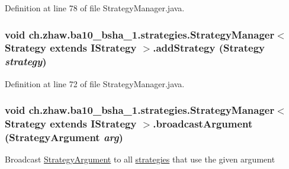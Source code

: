 Definition at line 78 of file StrategyManager.java.\hypertarget{classch_1_1zhaw_1_1ba10__bsha__1_1_1strategies_1_1StrategyManager_3_01Strategy_01extends_01IStrategy_01_4_aa3357bbf3d2374c3999ddf5195f31733}{
\subsubsection[{addStrategy}]{\setlength{\rightskip}{0pt plus 5cm}void ch.zhaw.ba10\_\-bsha\_\-1.strategies.StrategyManager$<$ Strategy extends {\bf IStrategy} $>$.addStrategy (Strategy {\em strategy})}}
\label{classch_1_1zhaw_1_1ba10__bsha__1_1_1strategies_1_1StrategyManager_3_01Strategy_01extends_01IStrategy_01_4_aa3357bbf3d2374c3999ddf5195f31733}


Definition at line 72 of file StrategyManager.java.\hypertarget{classch_1_1zhaw_1_1ba10__bsha__1_1_1strategies_1_1StrategyManager_3_01Strategy_01extends_01IStrategy_01_4_a1bf1d33af692c8658a24d0b935c4f039}{
\subsubsection[{broadcastArgument}]{\setlength{\rightskip}{0pt plus 5cm}void ch.zhaw.ba10\_\-bsha\_\-1.strategies.StrategyManager$<$ Strategy extends {\bf IStrategy} $>$.broadcastArgument ({\bf StrategyArgument} {\em arg})}}
\label{classch_1_1zhaw_1_1ba10__bsha__1_1_1strategies_1_1StrategyManager_3_01Strategy_01extends_01IStrategy_01_4_a1bf1d33af692c8658a24d0b935c4f039}
Broadcast \hyperlink{classch_1_1zhaw_1_1ba10__bsha__1_1_1StrategyArgument}{StrategyArgument} to all \hyperlink{namespacech_1_1zhaw_1_1ba10__bsha__1_1_1strategies}{strategies} that use the given argument


